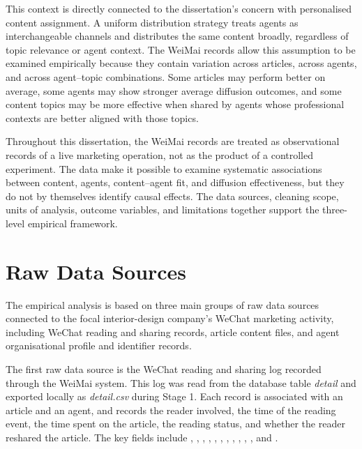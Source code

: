 This context is directly connected to the dissertation’s concern with personalised content assignment. A uniform distribution strategy treats agents as interchangeable channels and distributes the same content broadly, regardless of topic relevance or agent context. The WeiMai records allow this assumption to be examined empirically because they contain variation across articles, across agents, and across agent–topic combinations. Some articles may perform better on average, some agents may show stronger average diffusion outcomes, and some content topics may be more effective when shared by agents whose professional contexts are better aligned with those topics.

Throughout this dissertation, the WeiMai records are treated as observational records of a live marketing operation, not as the product of a controlled experiment. The data make it possible to examine systematic associations between content, agents, content–agent fit, and diffusion effectiveness, but they do not by themselves identify causal effects. The data sources, cleaning scope, units of analysis, outcome variables, and limitations together support the three-level empirical framework.

\section{Raw Data Sources}
\label{sec:3-2-raw-data-sources}

The empirical analysis is based on three main groups of raw data sources connected to the focal interior-design company’s WeChat marketing activity, including WeChat reading and sharing records, article content files, and agent organisational profile and identifier records.

The first raw data source is the WeChat reading and sharing log recorded through the WeiMai system. This log was read from the database table \emph{detail} and exported locally as \emph{detail.csv} during Stage 1. Each record is associated with an article and an agent, and records the reader involved, the time of the reading event, the time spent on the article, the reading status, and whether the reader reshared the article. The key fields include ,\allowbreak{} ,\allowbreak{} ,\allowbreak{} ,\allowbreak{} ,\allowbreak{} ,\allowbreak{} ,\allowbreak{} ,\allowbreak{} ,\allowbreak{} ,\allowbreak{} ,\allowbreak{} and .


